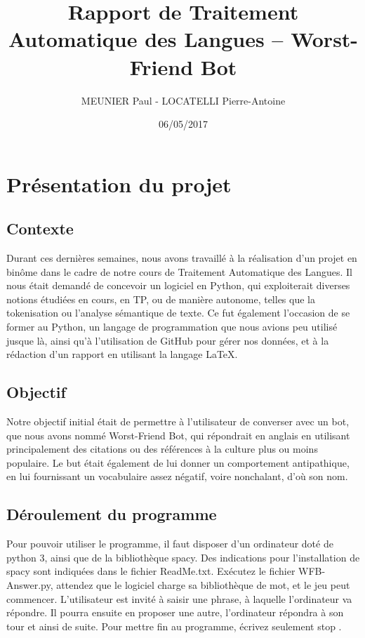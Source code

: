 \documentclass[paper=a4, fontsize=12pt]{article}
\begin{document}
\title{Rapport de Traitement Automatique des Langues -- Worst-Friend Bot}
\author{MEUNIER Paul - LOCATELLI Pierre-Antoine}
\date{06/05/2017}
\maketitle

\section{Présentation du projet}

\subsection{Contexte}
Durant ces dernières semaines, nous avons travaillé à la réalisation d'un projet en binôme dans le cadre de notre cours de Traitement Automatique des Langues. Il nous était demandé de concevoir un logiciel en Python, qui exploiterait diverses notions étudiées en cours, en TP, ou de manière autonome, telles que la tokenisation ou l'analyse sémantique de texte. Ce fut également l'occasion de se former au Python, un langage de programmation que nous avions peu utilisé jusque là, ainsi qu'à l'utilisation de GitHub pour gérer nos données, et à la rédaction d'un rapport en utilisant la langage LaTeX.


\subsection{Objectif}
Notre objectif initial était de permettre à l'utilisateur de converser avec un bot, que nous avons nommé Worst-Friend Bot, qui répondrait en anglais en utilisant principalement des citations ou des références à la culture plus ou moins populaire. Le but était également de lui donner un comportement antipathique, en lui fournissant un vocabulaire assez négatif, voire nonchalant, d'où son nom.

\subsection{Déroulement du programme}
Pour pouvoir utiliser le programme, il faut disposer d'un ordinateur doté de python 3, ainsi que de la bibliothèque spacy. Des indications pour l'installation de spacy sont indiquées dans le fichier ReadMe.txt. Exécutez le fichier WFB-Answer.py, attendez que le logiciel charge sa bibliothèque de mot, et le jeu peut commencer. L'utilisateur est invité à saisir une phrase, à laquelle l'ordinateur va répondre. Il pourra ensuite en proposer une autre, l'ordinateur répondra à son tour et ainsi de suite. Pour mettre fin au programme, écrivez seulement \og stop \fg{}.
\end{document}
